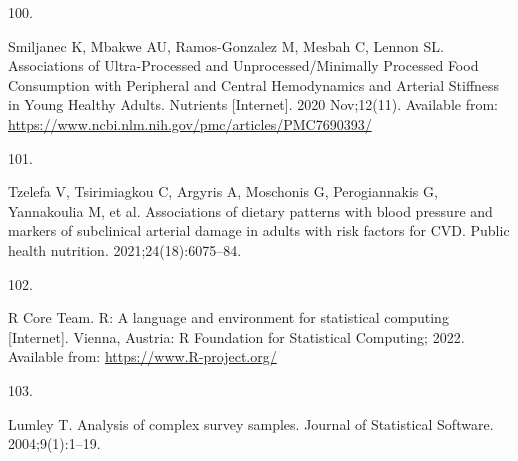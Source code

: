 \documentclass[
]{article}
\newlength{\cslhangindent}
\newlength{\csllabelwidth}
\newlength{\cslentryspacingunit} %
\newenvironment{CSLReferences}[2] %
 {%
  \setlength{\parindent}{0pt}
  \ifodd #1
  \let\oldpar\par
  \def\par{\hangindent=\cslhangindent\oldpar}
  \fi
  \setlength{\parskip}{#2\cslentryspacingunit}
 }%
 {}
\newcommand{\CSLLeftMargin}[1]{\parbox[t]{\csllabelwidth}{#1}}
\newcommand{\CSLRightInline}[1]{\parbox[t]{\linewidth - \csllabelwidth}{#1}\break}
\begin{document}
\begin{CSLReferences}{0}{0}
\leavevmode{}%
\CSLLeftMargin{100. }%
\CSLRightInline{Smiljanec K, Mbakwe AU, Ramos-Gonzalez M, Mesbah C,
Lennon SL. Associations of Ultra-Processed and Unprocessed/Minimally
Processed Food Consumption with Peripheral and Central Hemodynamics and
Arterial Stiffness in Young Healthy Adults. Nutrients {[}Internet{]}.
2020 Nov;12(11). Available from:
\url{https://www.ncbi.nlm.nih.gov/pmc/articles/PMC7690393/}}

\leavevmode{}%
\CSLLeftMargin{101. }%
\CSLRightInline{Tzelefa V, Tsirimiagkou C, Argyris A, Moschonis G,
Perogiannakis G, Yannakoulia M, et al. Associations of dietary patterns
with blood pressure and markers of subclinical arterial damage in adults
with risk factors for {CVD}. Public health nutrition.
2021;24(18):6075--84. }

\leavevmode{}%
\CSLLeftMargin{102. }%
\CSLRightInline{R Core Team. {R}: A language and environment for
statistical computing {[}Internet{]}. Vienna, Austria: R Foundation for
Statistical Computing; 2022. Available from:
\url{https://www.R-project.org/}}

\leavevmode{}%
\CSLLeftMargin{103. }%
\CSLRightInline{Lumley T. Analysis of complex survey samples. Journal of
Statistical Software. 2004;9(1):1--19. }

\end{CSLReferences}
\end{document}

